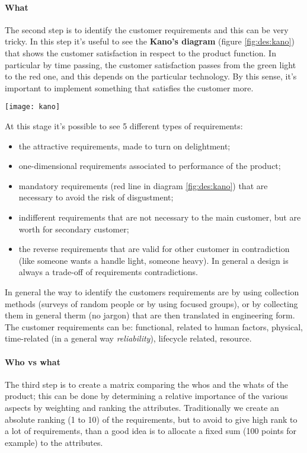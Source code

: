 		\paragraph{What} The second step is to identify the customer requirements and this can be very tricky. In this step it's useful to see the \textbf{Kano's diagram} (figure \ref{fig:des:kano}) that shows the customer satisfaction in respect to the product function. In particular by time passing, the customer satisfaction passes from the green light to the red one, and this depends on the particular technology. By this sense, it's important to implement something that satisfies the customer more.

		\begin{SCfigure}[0.6][b]
			\centering
			\texttt{[image: kano]}
			\caption{Kano's diagram.}
			\label{fig:des:kano}
		\end{SCfigure}
		
		At this stage it's possible to see 5 different types of requirements:
		\begin{itemize}
			\item the attractive requirements, made to turn on delightment;
			\item one-dimensional requirements associated to performance of the product;
			\item mandatory requirements (red line in diagram \ref{fig:des:kano}) that are necessary to avoid the risk of disgustment;
			\item indifferent requirements that are not necessary to the main customer, but are worth for secondary customer;
			\item the reverse requirements that are valid for other customer in contradiction (like someone wants a handle light, someone heavy). In general a design is always a trade-off of requirements contradictions.
		\end{itemize}
		In general the way to identify the customers requirements are by using collection methods (surveys of random people or by using focused groups), or by collecting them in general therm (no jargon) that are then translated in engineering form. \\
		The customer requirements can be: functional, related to human factors, physical, time-related (in a general way \textit{reliability}), lifecycle related, resource.
		
		\paragraph{Who vs what} The third step is to create a matrix comparing the whos and the whats of the product; this can be done by determining a relative importance of the various aspects by weighting and ranking the attributes. Traditionally we create an absolute ranking (1 to 10) of the requirements, but to avoid to give high rank to a lot of requirements, than a good idea is to allocate a fixed sum (100 points for example) to the attributes.
		
